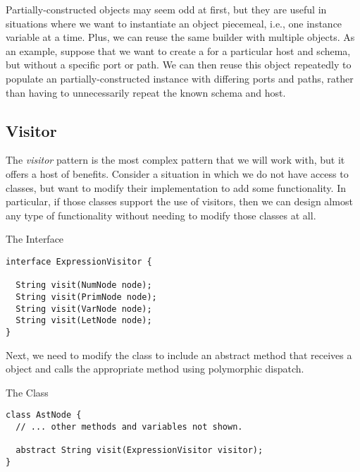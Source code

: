Partially-constructed objects may seem odd at first, but they are useful in situations where we want to instantiate an object piecemeal, i.e., one instance variable at a time. Plus, we can reuse the same builder with multiple objects. As an example, suppose that we want to create a  for a particular host and schema, but without a specific port or path. We can then reuse this object repeatedly to populate an partially-constructed instance with differing ports and paths, rather than having to unnecessarily repeat the known schema and host.

\subsection*{Visitor}

The \textit{visitor} pattern is the most complex pattern that we will work with, but it offers a host of benefits. Consider a situation in which we do not have access to classes, but want to modify their implementation to add some functionality. In particular, if those classes support the use of visitors, then we can design almost any type of functionality without needing to modify those classes at all.


\begin{cl}[]{The  Interface}
\begin{lstlisting}[language=MyJava]
interface ExpressionVisitor {
  
  String visit(NumNode node);
  String visit(PrimNode node);
  String visit(VarNode node);
  String visit(LetNode node);
}
\end{lstlisting}
\end{cl}

Next, we need to modify the  class to include an abstract  method that receives a  object and calls the appropriate  method using polymorphic dispatch. 

\begin{cl}[]{The  Class}
\begin{lstlisting}[language=MyJava]
class AstNode {
  // ... other methods and variables not shown.

  abstract String visit(ExpressionVisitor visitor);
}
\end{lstlisting}
\end{cl}

